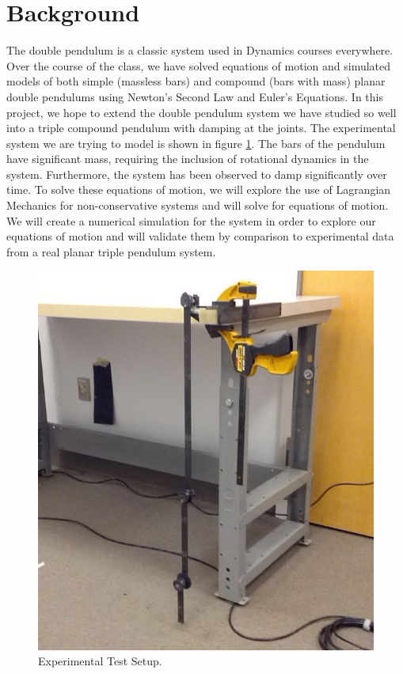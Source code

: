 \section{Background}
The double pendulum is a classic system used in Dynamics courses everywhere.  Over the course of the class, we have solved equations of motion and simulated models of both simple (massless bars) and compound (bars with mass) planar double pendulums using Newton's Second Law and Euler's Equations.  In this project, we hope to extend the double pendulum system we have studied so well into a triple compound pendulum with damping at the joints.  The experimental system we are trying to model is shown in figure \ref{expsetup}.  The bars of the pendulum have significant mass, requiring the inclusion of rotational dynamics in the system. Furthermore, the system has been observed to damp significantly over time. To solve these equations of motion, we will explore the use of Lagrangian Mechanics for non-conservative systems and will solve for equations of motion.  We will create a numerical simulation for the system in order to explore our equations of motion and will validate them by comparison to experimental data from a real planar triple pendulum system. 

\begin{figure}[H]
\centering
\includegraphics[scale=0.3]{testsetup.JPG}
\caption{Experimental Test Setup.}
\label{expsetup}
\end{figure} 


